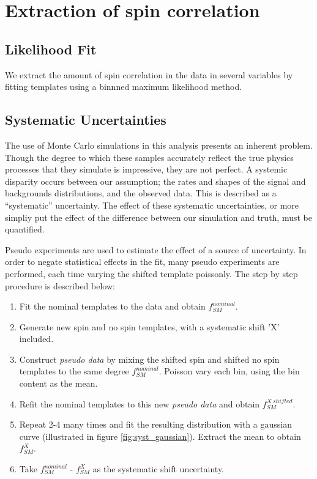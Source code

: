 \chapter{Extraction of spin correlation}

\section{Likelihood Fit}
\label{sec:extraction}

We extract the amount of spin correlation in the data in several variables by fitting templates using a binnned maximum likelihood method. 



\section{Systematic Uncertainties}
\label{sec:systematics}

The use of Monte Carlo simulations in this analysis presents an inherent problem. Though the degree to which these samples accurately reflect the true physics processes that they simulate is impressive, they are not perfect. A systemic disparity occurs between our assumption; the rates and shapes of the signal and backgrounds distributions, and the observed data. This is described as a ``systematic'' uncertainty. The effect of these systematic uncertainties, or more simpliy put the effect of the difference between our simulation and truth, must be quantified.

Pseudo experiments are used to estimate the effect of a source of uncertainty. In order to negate statistical effects in the fit, many pseudo experiments are performed, each time varying the shifted template poissonly. The step by step procedure is described below:
 
\begin{enumerate}
	\item Fit the nominal templates to the data and obtain $f_{SM}^{nominal}$.
	\item Generate new spin and no spin templates, with a systematic shift 'X' included.
	\item Construct \textit{pseudo data} by mixing the shifted spin and shifted no spin templates to the same degree $f_{SM}^{nominal}$. Poisson vary each bin, using the bin content as the mean.
	\item Refit the nominal templates to this new \textit{pseudo data} and obtain $f_{SM}^{X~shifted}$.
	\item Repeat 2-4 many times and fit the resulting distribution with a gaussian curve (illustrated in figure \ref{fig:syst_gaussian}). Extract the mean to obtain $f_{SM}^{X}$.
	\item Take $f_{SM}^{nominal}$ - $f_{SM}^{X}$ as the systematic shift uncertainty.
\end{enumerate}

